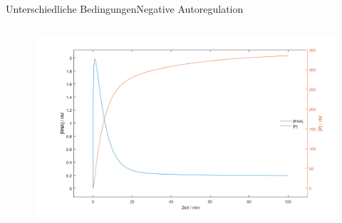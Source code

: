 \documentclass[11pt,aspectratio=169,reqno]{beamer}
\begin{document}
\begin{frame}{Unterschiedliche Bedingungen\hfill {\small Negative Autoregulation}}
\begin{columns}
        \begin{figure}
            \centering
            \includegraphics[width=\linewidth]{images/simulations/negative_autoregulation_low_affinity.m.png}
        \end{figure}
    \end{columns}
\end{frame}
\end{document}
